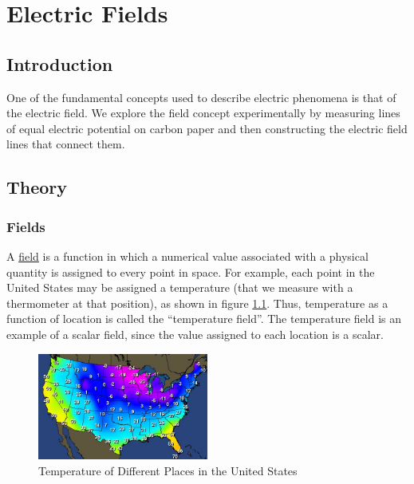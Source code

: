 \chapter{Electric Fields}

\section{Introduction}

One of the fundamental concepts used to describe electric phenomena is that of the electric field. We explore the field concept experimentally by measuring lines of equal electric potential on carbon paper and then constructing the electric field lines that connect them.

\section{Theory}

\subsection{Fields}

A \underline{field} is a function in which a numerical value associated with a physical quantity is assigned to every point in space. For example, each point in the United States may be assigned a temperature (that we measure with a thermometer at that position), as shown in figure \ref{fig:temp_field}. Thus, temperature as a function of location is called the ``temperature field''. The temperature field is an example of a scalar field, since the value assigned to each location is a scalar.

\begin{figure}[h]
    \begin{center}
        \includegraphics[width=0.5\textwidth]{./Exp1/pic/tempfield.jpg}
    \end{center}
    \caption{Temperature of Different Places in the United States}
    \label{fig:temp_field}
\end{figure}

